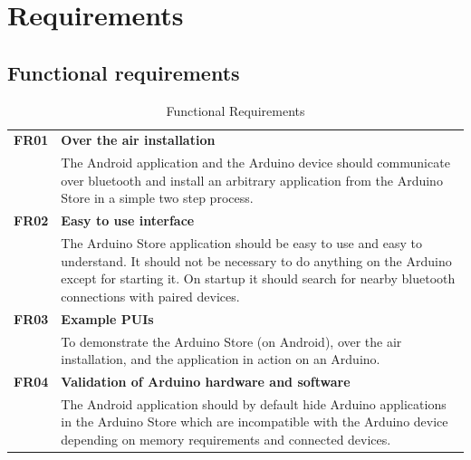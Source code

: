 \chapter{Requirements}
\section{Functional requirements}
\begin{table}[H]
\begin{tabularx}{\linewidth}{lX}
\textbf{FR01} & \textbf{Over the air installation}\\
 & The Android application and the Arduino device should communicate over bluetooth and install an arbitrary application from the Arduino Store in a simple two step process.\\
\textbf{FR02} & \textbf{Easy to use interface}\\
 & The Arduino Store application should be easy to use and easy to understand. It should not be necessary to do anything on the Arduino except for starting it. On startup it should search for nearby bluetooth connections with paired devices.\\
 \textbf{FR03} & \textbf{Example PUIs}\\
 & To demonstrate the Arduino Store (on Android), over the air installation, and the application in action on an Arduino.\\
\textbf{FR04} & \textbf{Validation of Arduino hardware and software}\\
 & The Android application should by default hide Arduino applications in the Arduino Store which are incompatible with the Arduino device depending on memory requirements and connected devices.\\
\end{tabularx}
\caption{Functional Requirements}
\end{table}

